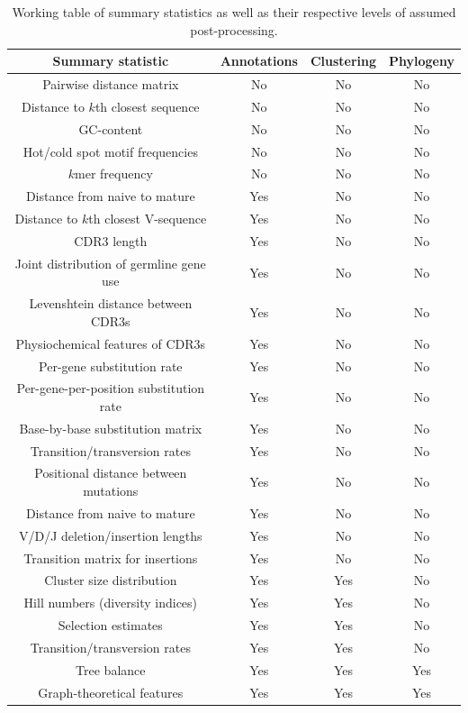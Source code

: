 \documentclass{article}
\begin{document}
\begin{table}
\begin{tabular}{c|c|c|c}
Summary statistic & Annotations & Clustering & Phylogeny
\\
\hline \hline
Pairwise distance matrix & No & No & No \\
Distance to $k$th closest sequence & No & No & No \\
GC-content & No & No & No \\
Hot/cold spot motif frequencies & No & No & No \\
$k$mer frequency & No & No & No \\
\hline
Distance from naive to mature & Yes & No & No \\
Distance to $k$th closest V-sequence & Yes & No & No \\
CDR3 length & Yes & No & No \\
Joint distribution of germline gene use & Yes & No & No \\
Levenshtein distance between CDR3s & Yes & No & No \\
Physiochemical features of CDR3s & Yes & No & No \\
Per-gene substitution rate & Yes & No & No \\
Per-gene-per-position substitution rate & Yes & No & No \\
Base-by-base substitution matrix & Yes & No & No \\
Transition/transversion rates & Yes & No & No \\
Positional distance between mutations & Yes & No & No \\
Distance from naive to mature & Yes & No & No \\
V/D/J deletion/insertion lengths & Yes & No & No \\
Transition matrix for insertions & Yes & No & No \\
\hline
Cluster size distribution & Yes & Yes & No \\
Hill numbers (diversity indices) & Yes & Yes & No \\
Selection estimates & Yes & Yes & No \\
Transition/transversion rates & Yes & Yes & No \\
\hline
Tree balance & Yes & Yes & Yes \\
Graph-theoretical features & Yes & Yes & Yes \\
\end{tabular}
\caption{Working table of summary statistics as well as their respective levels of assumed post-processing.}
\label{tab:SummaryStatistics}
\end{table}
\end{document}
